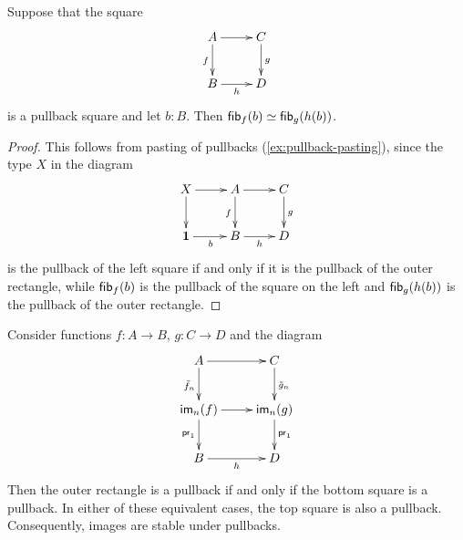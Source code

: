 \begin{lem}\label{lem:hfiber_wrt_pullback}
Suppose that the square
\begin{equation*}
  \vcenter{\xymatrix{
      A\ar[r]\ar[d]_f &
      C\ar[d]^g\\
      B\ar[r]_-h &
      D
      }}
\end{equation*}
is a pullback square and let $b:B$. Then ${\mathsf{fib}}_{f}(b)\simeq{\mathsf{fib}}_{g}(h(b))$.
\end{lem}

\begin{proof}
This follows from pasting of pullbacks (\autoref{ex:pullback-pasting}), since the type $X$ in the diagram
\begin{equation*}
  \vcenter{\xymatrix{
      X\ar[r]\ar[d] &
      A\ar[r]\ar[d]_f &
      C\ar[d]^g\\
      \unit\ar[r]_b &
      B\ar[r]_h &
      D
      }}
\end{equation*}
is the pullback of the left square if and only if it is the pullback of the outer rectangle, while ${\mathsf{fib}}_{f}(b)$ is the pullback of the square on the left and ${\mathsf{fib}}_{g}(h(b))$ is the pullback of the outer rectangle.
\end{proof}

\begin{thm}\label{thm:stable-images}
Consider functions $f:A\to B$, $g:C\to D$ and the diagram
\begin{equation*}
  \vcenter{\xymatrix{
      A\ar[r]\ar[d]_{\tilde{f}_n} &
      C\ar[d]^{\tilde{g}_n}\\
      \im_n(f)\ar[r]\ar[d]_{\proj1} &
      \im_n(g)\ar[d]^{\proj1}\\
      B\ar[r]_h &
      D
      }}
\end{equation*}
Then the outer rectangle is a pullback if and only if the bottom square is a pullback. In either of these equivalent cases, the top square
is also a pullback. Consequently, images are stable under pullbacks.
\end{thm}

